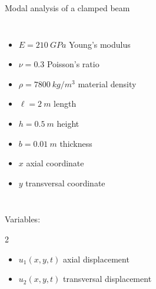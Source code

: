 \documentclass[aspectratio=169]{beamer}
\begin{document}
\begin{frame}{Modal analysis of a clamped beam}
\begin{columns}
    {\tiny \begin{itemize}\setlength\itemsep{0.05em}
        \item $E=210\ GPa$ Young's modulus
        \item $\nu=0.3$ Poisson's ratio
        \item $\rho=7800\ kg/m^3$ material density
        \item $\ell=2\ m$ length
        \item $h=0.5\ m$ height
        \item $b=0.01\ m$ thickness
        \item $x$ axial coordinate
        \item $y$ transversal coordinate
      \end{itemize}}
  \end{columns}
  \begin{block}{Variables:}
    \begin{multicols}{2}
      \begin{itemize}\setlength\itemsep{0.05em}
        \item $u_{1}(x,y,t)$ axial displacement
        \item $u_{2}(x,y,t)$ transversal displacement\vspace{.1cm}
      \end{itemize}
    \end{multicols}
  \end{block}
\end{frame}
\end{document}
